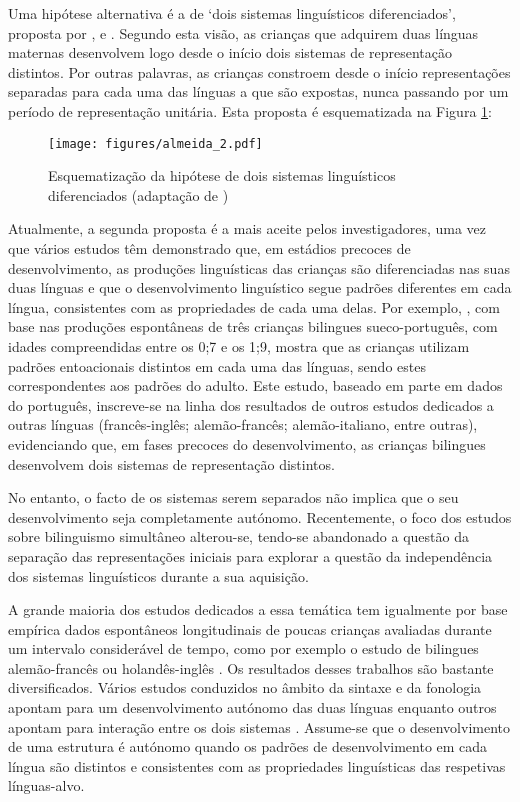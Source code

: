 \documentclass[output=paper]{LSP/langsci}
\begin{document}
Uma hipótese alternativa é a de ‘dois sistemas linguísticos diferenciados’, proposta por \citet{genesee1989}, \cite{leisel1989} e \cite{dehouwer1990}. Segundo esta visão, as crianças que adquirem duas línguas maternas desenvolvem logo desde o início dois sistemas de representação distintos. Por outras palavras, as crianças constroem desde o início representações separadas para cada uma das línguas a que são expostas, nunca passando por um período de representação unitária. Esta proposta é esquematizada na Figura \ref{fig:almeida_2}:

\begin{figure}
\texttt{[image: figures/almeida\_2.pdf]}
\caption{Esquematização da hipótese de dois sistemas linguísticos diferenciados (adaptação de \citealt{genesee_etal2004})}
\label{fig:almeida_2}
\end{figure}

Atualmente, a segunda proposta é a mais aceite pelos investigadores, uma vez que vários estudos têm demonstrado que, em estádios precoces de desenvolvimento, as produções linguísticas das crianças são diferenciadas nas suas duas línguas e que o desenvolvimento linguístico segue padrões diferentes em cada língua, consistentes com as propriedades de cada uma delas. Por exemplo, \cite{cruz-ferreira2003}, com base nas produções espontâneas de três crianças bilingues sueco-português, com idades compreendidas entre os 0;7 e os 1;9, mostra que as crianças utilizam padrões entoacionais distintos em cada uma das línguas, sendo estes correspondentes aos padrões do adulto. Este estudo, baseado em parte em dados do português, inscreve-se na linha dos resultados de outros estudos dedicados a outras línguas (francês-inglês; alemão-francês; alemão-italiano, entre outras), evidenciando que, em fases precoces do desenvolvimento, as crianças bilingues desenvolvem dois sistemas de representação distintos.

No entanto, o facto de os sistemas serem separados não implica que o seu desenvolvimento seja completamente autónomo. Recentemente, o foco dos estudos sobre bilinguismo simultâneo alterou-se, tendo-se abandonado a questão da separação das representações iniciais para explorar a questão da independência dos sistemas linguísticos durante a sua aquisição. 

A grande maioria dos estudos dedicados a essa temática tem igualmente por base empírica dados espontâneos longitudinais de poucas crianças avaliadas durante um intervalo considerável de tempo, como por exemplo o estudo de bilingues alemão-francês \citep{leisel1989} ou holandês-inglês \citep{dehouwer1990}. Os resultados desses trabalhos são bastante diversificados. Vários estudos conduzidos no âmbito da sintaxe e da fonologia apontam para um desenvolvimento autónomo das duas línguas enquanto outros apontam para interação entre os dois sistemas \citep{genesee_etal2004,meisel2004}. Assume-se que o desenvolvimento de uma estrutura é autónomo quando os padrões de desenvolvimento em cada língua são distintos e consistentes com as propriedades linguísticas das respetivas línguas-alvo. 
\end{document}
